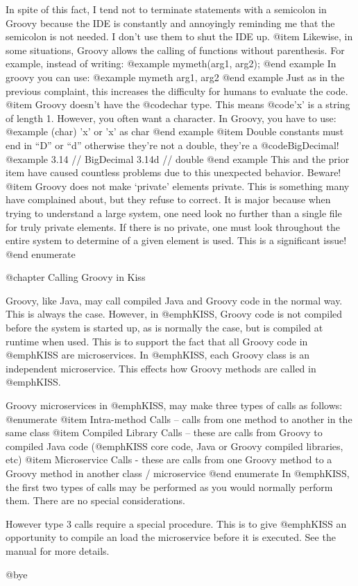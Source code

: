 In spite of this fact, I tend not to terminate statements with a
semicolon in Groovy because the IDE is constantly and annoyingly
reminding me that the semicolon is not needed.  I don't use them to
shut the IDE up.
@item   
Likewise, in some situations, Groovy allows the calling of
functions without parenthesis.  For example, instead of writing:
@example   
      mymeth(arg1, arg2);
@end example
   In groovy you can use:
@example
      mymeth arg1, arg2
@end example
Just as in the previous complaint, this increases the difficulty
for humans to evaluate the code.
@item
Groovy doesn't have the @code{char} type.  This means @code{'x'} is a string of
length 1.  However, you often want a character.  In Groovy, you
have to use:
@example   
      (char) 'x'
        or
      'x' as char
@end example
@item
Double constants must end in ``D'' or ``d'' otherwise they're not a double,
they're a @code{BigDecimal}!
@example
    3.14  // BigDecimal
    3.14d // double
@end example
This and the prior item have caused countless problems due to this unexpected
behavior.  Beware!
@item
Groovy does not make `private' elements private.  This is something
many have complained about, but they refuse to correct.  It is major
because when trying to understand a large system, one need look no
further than a single file for truly private elements.  If there is no
private, one must look throughout the entire system to determine of a
given element is used.  This is a significant issue!
@end enumerate    

@chapter Calling Groovy in Kiss

Groovy, like Java, may call compiled Java and Groovy code in the
normal way.  This is always the case.  However, in @emph{KISS}, Groovy
code is not compiled before the system is started up, as is normally
the case, but is compiled at runtime when used.  This is to support
the fact that all Groovy code in @emph{KISS} are microservices.
In @emph{KISS}, each Groovy class is an independent microservice.
This effects how Groovy methods are called in @emph{KISS}.

Groovy microservices in @emph{KISS}, may make three types of calls as follows:
@enumerate
@item
Intra-method Calls -- calls from one method to another in the same class
@item
Compiled Library Calls -- these are calls from Groovy to compiled Java
code (@emph{KISS} core code, Java or Groovy compiled libraries, etc)
@item 
Microservice Calls - these are calls from one Groovy method to a Groovy
method in another class / microservice
@end enumerate
In @emph{KISS}, the first two types of calls may be performed as you would normally
perform them.  There are no special considerations.

However type 3 calls require a special procedure.  This is to give @emph{KISS}
an opportunity to compile an load the microservice before it is executed.
See the manual for more details.

    

@bye

